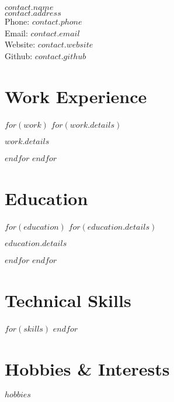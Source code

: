 \documentclass{cv-class}
\begin{document}
{\LARGE $contact.name$}\\[0.2cm]
$contact.address$\\
Phone: $contact.phone$\\
Email: \href{mailto:$contact.email$}{$contact.email$}\\
Website: \href{https://$contact.website$}{$contact.website$}\\
Github: \href{https://$contact.github$}{$contact.github$}

\section*{Work Experience}
$for(work)$
$for(work.details)$
\begin{workitem}
  \item $work.details$
\end{workitem}
$endfor$
$endfor$

\section*{Education}
$for(education)$
$for(education.details)$
\begin{educationitem}
  \item $education.details$
\end{educationitem}
$endfor$
$endfor$

\section*{Technical Skills}
$for(skills)$
$endfor$

\section*{Hobbies \& Interests}
$hobbies$
\end{document}
